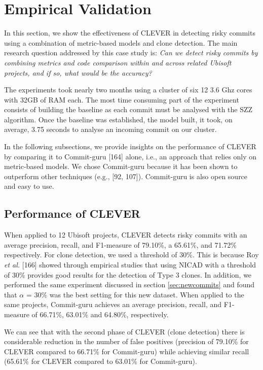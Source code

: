 \documentclass[12pt]{report}
\begin{document}
\section{Empirical Validation}\label{sec:result-bianca}

In this section, we show the effectiveness of CLEVER in detecting risky
commits using a combination of metric-based models and clone detection.
The main research question addressed by this case study is: \emph{Can we
detect risky commits by combining metrics and code comparison within and
across related Ubisoft projects, and if so, what would be the accuracy?}

The experiments took nearly two months using a cluster of six 12 3.6 Ghz
cores with 32GB of RAM each. The most time consuming part of the
experiment consists of building the baseline as each commit must be
analysed with the SZZ algorithm. Once the baseline was established, the
model built, it took, on average, 3.75 seconds to analyse an incoming
commit on our cluster.

In the following subsections, we provide insights on the performance of
CLEVER by comparing it to Commit-guru {[}164{]} alone, i.e., an approach
that relies only on metric-based models. We chose Commit-guru because it
has been shown to outperform other techniques (e.g., {[}92, 107{]}).
Commit-guru is also open source and easy to use.

\subsection{Performance of CLEVER}\label{performance-of-clever}

When applied to 12 Ubisoft projects, CLEVER detects risky commits with
an average precision, recall, and F1-measure of 79.10\%, a 65.61\%, and
71.72\% respectively. For clone detection, we used a threshold of 30\%.
This is because Roy \emph{et al.} {[}166{]} showed through empirical
studies that using NICAD with a threshold of 30\% provides good results
for the detection of Type 3 clones. In addition, we performed the same
experiment discussed in section \ref{sec:newcommits} and found that
\(\alpha\) = 30\% was the best setting for this new dataset. When
applied to the same projects, Commit-guru achieves an average precision,
recall, and F1-measure of 66.71\%, 63.01\% and 64.80\%, respectively.

We can see that with the second phase of CLEVER (clone detection) there
is considerable reduction in the number of false positives (precision of
79.10\% for CLEVER compared to 66.71\% for Commit-guru) while achieving
similar recall (65.61\% for CLEVER compared to 63.01\% for Commit-guru).
\end{document}
